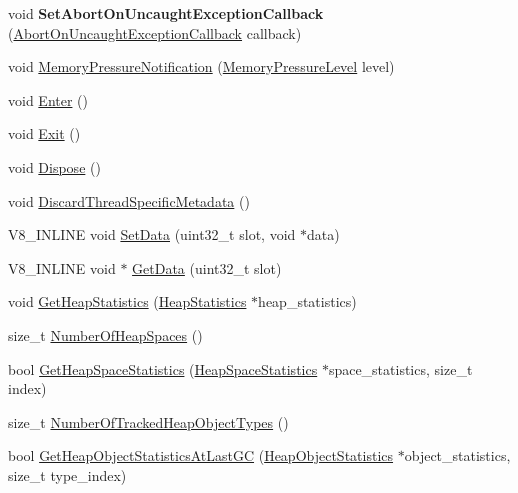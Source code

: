 \begin{DoxyCompactItemize}
\item 
void {\bfseries Set\+Abort\+On\+Uncaught\+Exception\+Callback} (\hyperlink{classv8_1_1Isolate_aeb1d49e500d9521b42743a6a740271e2}{Abort\+On\+Uncaught\+Exception\+Callback} callback)\hypertarget{classv8_1_1Isolate_afb7aad57eec61464b5a7c3816bae60be}{}\label{classv8_1_1Isolate_afb7aad57eec61464b5a7c3816bae60be}

\item 
void \hyperlink{classv8_1_1Isolate_ae1b8d5696ba55dd3412989811c44c373}{Memory\+Pressure\+Notification} (\hyperlink{namespacev8_ae0e9a25bf51e518585f555806e7dc7b9}{Memory\+Pressure\+Level} level)
\item 
void \hyperlink{classv8_1_1Isolate_aec80bb49b6b7647ff75e8f2cc9484ea3}{Enter} ()
\item 
void \hyperlink{classv8_1_1Isolate_a64a8503cafd00d1d2cadfbb0c2345054}{Exit} ()
\item 
void \hyperlink{classv8_1_1Isolate_a1a5a5762e4221aff8c6b10f9e3cec0af}{Dispose} ()
\item 
void \hyperlink{classv8_1_1Isolate_ac62ff53be40f5ecd74fc9e72451da115}{Discard\+Thread\+Specific\+Metadata} ()
\item 
V8\+\_\+\+I\+N\+L\+I\+NE void \hyperlink{classv8_1_1Isolate_a2ae968a7ff8a397f1ac09d32990883f6}{Set\+Data} (uint32\+\_\+t slot, void $\ast$data)
\item 
V8\+\_\+\+I\+N\+L\+I\+NE void $\ast$ \hyperlink{classv8_1_1Isolate_aed85b3c82bf69a60ecebc2558ab95083}{Get\+Data} (uint32\+\_\+t slot)
\item 
void \hyperlink{classv8_1_1Isolate_add32e78544edaf8946ed9b328167e5e4}{Get\+Heap\+Statistics} (\hyperlink{classv8_1_1HeapStatistics}{Heap\+Statistics} $\ast$heap\+\_\+statistics)
\item 
size\+\_\+t \hyperlink{classv8_1_1Isolate_ad948acf0892e677a95fbc743b63ca5fa}{Number\+Of\+Heap\+Spaces} ()
\item 
bool \hyperlink{classv8_1_1Isolate_a28ab96294ee07064cbba01e969b62cbc}{Get\+Heap\+Space\+Statistics} (\hyperlink{classv8_1_1HeapSpaceStatistics}{Heap\+Space\+Statistics} $\ast$space\+\_\+statistics, size\+\_\+t index)
\item 
size\+\_\+t \hyperlink{classv8_1_1Isolate_a170044cddf655345682cb3c9b4bd1788}{Number\+Of\+Tracked\+Heap\+Object\+Types} ()
\item 
bool \hyperlink{classv8_1_1Isolate_a677681d4c3abfc1bc2e8b50c23623e24}{Get\+Heap\+Object\+Statistics\+At\+Last\+GC} (\hyperlink{classv8_1_1HeapObjectStatistics}{Heap\+Object\+Statistics} $\ast$object\+\_\+statistics, size\+\_\+t type\+\_\+index)

\end{DoxyCompactItemize}
